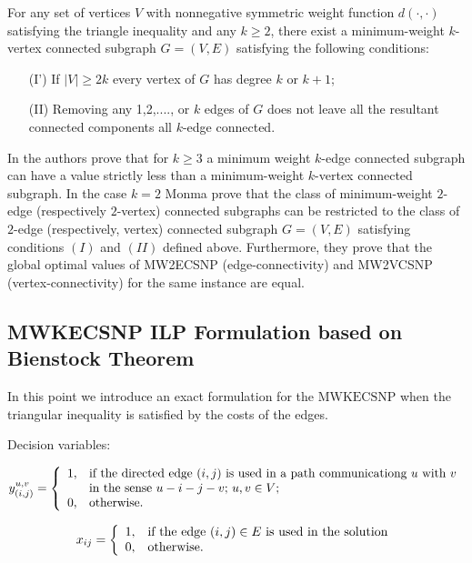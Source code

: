 \begin{theorem}[\cite{116}]
For any set of vertices $V$ with nonnegative symmetric weight
function $d(\cdot,\cdot)$ satisfying the triangle inequality and
any $k\geq 2$, there exist a minimum-weight $k$-vertex connected
subgraph $G=(V,E)$ satisfying the following conditions:
\begin{enumerate}
    \item[(I')] If $|V|\geq 2k$ every vertex of $G$ has degree $k$ or $k+1$;
    \item[(II)] Removing any 1,2,...., or $k$ edges of $G$ does not
    leave all the resultant connected components all $k$-edge
    connected.
\end{enumerate}
\end{theorem}

\noindent In \cite{116} the authors
prove that for $k\geq 3$ a minimum weight $k$-edge connected
subgraph can have a value strictly less than a minimum-weight
$k$-vertex connected subgraph. In the case $k=2$ \cite{117} Monma prove that the class of
minimum-weight $2$-edge (respectively $2$-vertex) connected
subgraphs can be restricted to the class of $2$-edge
(respectively, vertex) connected subgraph $G=(V,E)$ satisfying
conditions $(I)$ and $(II)$ defined above. Furthermore, they prove
that the global optimal values of MW2ECSNP (edge-connectivity) and
MW2VCSNP (vertex-connectivity) for the same instance are equal.\\

\subsection{MWKECSNP ILP Formulation based on Bienstock Theorem}
In this point we introduce an exact formulation for the
$\mathrm{MWKECSNP}$ when the triangular inequality is satisfied by
the costs of the edges.

Decision variables:

\[
   y_{(i,j)}^{u,v}=\left\{\begin{array}{ll}
                         1, & \hbox{if the directed edge $(i,j)$ is used in a path communicationg $u$ with $v$} \\
                            &  \hbox{in the sense $u-i-j-v$; $u,v\in V$;} \\
                         0, & \hbox{otherwise.}
                       \end{array}
                     \right.
\]

\[
x_{ij}=\left\{
                       \begin{array}{ll}
                         1, & \hbox{if the edge $(i,j)\in E$ is used in the solution} \\
                         0, & \hbox{otherwise.}
                       \end{array}
                     \right.
\]

